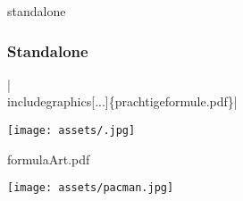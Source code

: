 
\begin{saveblock}{standalone}
\end{saveblock}

\begin{frame}
    \frametitle{Standalone}

    \centering


    \hll|\\includegraphics[...]\{prachtigeformule.pdf\}|

    \medskip
    

\end{frame}

\begin{frame}
    \texttt{[image: assets/.jpg]}
\end{frame}

\begin{frame}
    formulaArt.pdf
\end{frame}

\begin{frame}
    \texttt{[image: assets/pacman.jpg]}
\end{frame}
